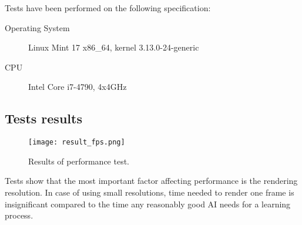 	Tests have been performed on the following specification:
	
	\begin{description}
		\item[Operating System] Linux Mint 17 x86\_64, kernel 3.13.0-24-generic
		\item[CPU] Intel Core i7-4790, 4x4GHz
	\end{description}

\subsection{Tests results}

\begin{figure}
\centering
\texttt{[image: result\_fps.png]}
\caption{Results of performance test.}
\label{fig:fps_test}
\end{figure}

Tests show that the most important factor affecting performance is the rendering resolution. In case of using small resolutions, time needed to render one frame is insignificant compared to the time any reasonably good AI needs for a learning process.



